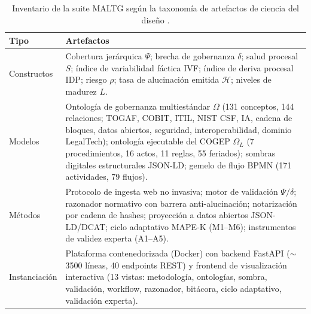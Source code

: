 \documentclass[computers,article,submit,pdftex,moreauthors]{Definitions/mdpi}
\begin{document}
\begin{table}[H]
\caption{Inventario de la suite MALTG según la taxonomía de artefactos de ciencia del diseño \cite{March1995}.}
\label{tab:tipos}
\begin{tabularx}{\textwidth}{lX}
\toprule
\textbf{Tipo} & \textbf{Artefactos}\\
\midrule
Constructos & Cobertura jerárquica $\Psi$; brecha de gobernanza $\delta$; salud procesal $S$; índice de variabilidad fáctica IVF; índice de deriva procesal IDP; riesgo $\rho$; tasa de alucinación emitida $\mathcal{H}$; niveles de madurez $L$.\\
Modelos & Ontología de gobernanza multiestándar $\Omega$ (131 conceptos, 144 relaciones; TOGAF, COBIT, ITIL, NIST CSF, IA, cadena de bloques, datos abiertos, seguridad, interoperabilidad, dominio LegalTech); ontología ejecutable del COGEP $\Omega_L$ (7 procedimientos, 16 actos, 11 reglas, 55 feriados); sombras digitales estructurales JSON-LD; gemelo de flujo BPMN (171 actividades, 79 flujos).\\
Métodos & Protocolo de ingesta web no invasiva; motor de validación $\Psi/\delta$; razonador normativo con barrera anti-alucinación; notarización por cadena de hashes; proyección a datos abiertos JSON-LD/DCAT; ciclo adaptativo MAPE-K (M1--M6); instrumentos de validez experta (A1--A5).\\
Instanciación & Plataforma contenedorizada (Docker) con backend FastAPI ($\sim$3500 líneas, 40 endpoints REST) y frontend de visualización interactiva (13 vistas: metodología, ontologías, sombra, validación, workflow, razonador, bitácora, ciclo adaptativo, validación experta).\\
\bottomrule
\end{tabularx}
\end{table}
\end{document}
